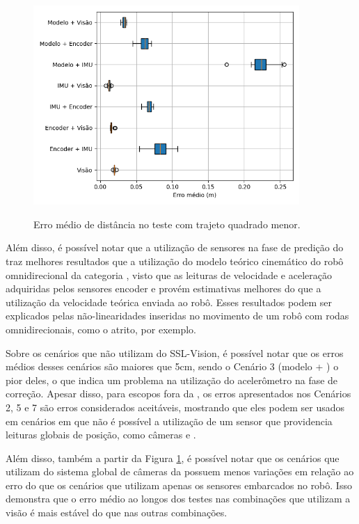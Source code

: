 \documentclass[acronym, symbols, table, deposito]{fei}
\begin{document}
	\begin{figure}[!htb]
		\centering
		\caption{Erro médio de distância no teste com trajeto quadrado menor.}
		\includegraphics[width=0.9\textwidth]{../Dados/Graficos-Resultados/erro_medio_distancia_quadrado_menor.png}
		\label{fig:erro_medio_distancia_quad_menor}
	\end{figure}

	Além disso, é possível notar que a utilização de sensores na fase de predição do  traz melhores resultados que a utilização do modelo teórico cinemático do robô omnidirecional da categoria , visto que as leituras de velocidade e aceleração adquiridas pelos sensores encoder e  provém estimativas melhores do que a utilização da velocidade teórica enviada ao robô. Esses resultados podem ser explicados pelas não-linearidades inseridas no movimento de um robô com rodas omnidirecionais, como o atrito, por exemplo.
	
	Sobre os cenários que não utilizam do SSL-Vision, é possível notar que os erros médios desses cenários são maiores que 5cm, sendo o Cenário 3 (modelo + ) o pior deles, o que indica um problema na utilização do acelerômetro na fase de correção. Apesar disso, para escopos fora da , os erros apresentados nos Cenários 2, 5 e 7 são erros considerados aceitáveis, mostrando que eles podem ser usados em cenários em que não é possível a utilização de um sensor que providencia leituras globais de posição, como câmeras e .

	Além disso, também a partir da Figura \ref{fig:erro_medio_distancia_quad_menor}, é possível notar que os cenários que utilizam do sistema global de câmeras da  possuem menos variações em relação ao erro do que os cenários que utilizam apenas os sensores embarcados no robô. Isso demonstra que o erro médio ao longos dos testes nas combinações que utilizam a visão é mais estável do que nas outras combinações.
	
\end{document}

